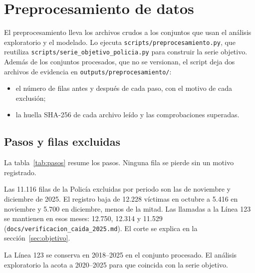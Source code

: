 
\section{Preprocesamiento de datos}\label{sec:preprocesamiento}

El preprocesamiento lleva los archivos crudos a los conjuntos que usan el análisis exploratorio y el modelado. Lo ejecuta \texttt{scripts/preprocesamiento.py}, que reutiliza \texttt{scripts/serie\_objetivo\_policia.py} para construir la serie objetivo. Además de los conjuntos procesados, que no se versionan, el script deja dos archivos de evidencia en \texttt{outputs/preprocesamiento/}:
\begin{itemize}
  \item el número de filas antes y después de cada paso, con el motivo de cada exclusión;
  \item la huella SHA-256 de cada archivo leído y las comprobaciones superadas.
\end{itemize}

\subsection{Pasos y filas excluidas}

La tabla~\ref{tab:pasos} resume los pasos. Ninguna fila se pierde sin un motivo registrado.

Las 11.116 filas de la Policía excluidas por periodo son las de noviembre y diciembre de 2025. El registro baja de 12.228 víctimas en octubre a 5.416 en noviembre y 5.700 en diciembre, menos de la mitad. Las llamadas a la Línea 123 se mantienen en esos meses: 12.750, 12.314 y 11.529 (\texttt{docs/verificacion\_\allowbreak{}caida\_\allowbreak{}2025.md}). El corte se explica en la sección~\ref{sec:objetivo}.

La Línea 123 se conserva en 2018--2025 en el conjunto procesado. El análisis exploratorio la acota a 2020--2025 para que coincida con la serie objetivo.

